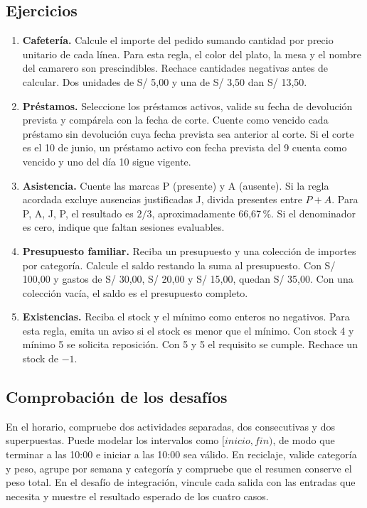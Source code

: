 \subsection{Ejercicios}

\begin{enumerate}
\item \textbf{Cafetería.} Calcule el importe del pedido sumando cantidad por precio unitario de cada línea. Para esta regla, el color del plato, la mesa y el nombre del camarero son prescindibles. Rechace cantidades negativas antes de calcular. Dos unidades de S/ 5,00 y una de S/ 3,50 dan S/ 13,50.
\item \textbf{Préstamos.} Seleccione los préstamos activos, valide su fecha de devolución prevista y compárela con la fecha de corte. Cuente como vencido cada préstamo sin devolución cuya fecha prevista sea anterior al corte. Si el corte es el 10 de junio, un préstamo activo con fecha prevista del 9 cuenta como vencido y uno del día 10 sigue vigente.
\item \textbf{Asistencia.} Cuente las marcas P (presente) y A (ausente). Si la regla acordada excluye ausencias justificadas J, divida presentes entre \(P+A\). Para P, A, J, P, el resultado es \(2/3\), aproximadamente 66,67\,\%. Si el denominador es cero, indique que faltan sesiones evaluables.
\item \textbf{Presupuesto familiar.} Reciba un presupuesto y una colección de importes por categoría. Calcule el saldo restando la suma al presupuesto. Con S/ 100,00 y gastos de S/ 30,00, S/ 20,00 y S/ 15,00, quedan S/ 35,00. Con una colección vacía, el saldo es el presupuesto completo.
\item \textbf{Existencias.} Reciba el stock y el mínimo como enteros no negativos. Para esta regla, emita un aviso si el stock es menor que el mínimo. Con stock 4 y mínimo 5 se solicita reposición. Con 5 y 5 el requisito se cumple. Rechace un stock de \(-1\).
\end{enumerate}

\subsection{Comprobación de los desafíos}

En el horario, compruebe dos actividades separadas, dos consecutivas y dos superpuestas. Puede modelar los intervalos como \([inicio, fin)\), de modo que terminar a las 10:00 e iniciar a las 10:00 sea válido. En reciclaje, valide categoría y peso, agrupe por semana y categoría y compruebe que el resumen conserve el peso total. En el desafío de integración, vincule cada salida con las entradas que necesita y muestre el resultado esperado de los cuatro casos.

